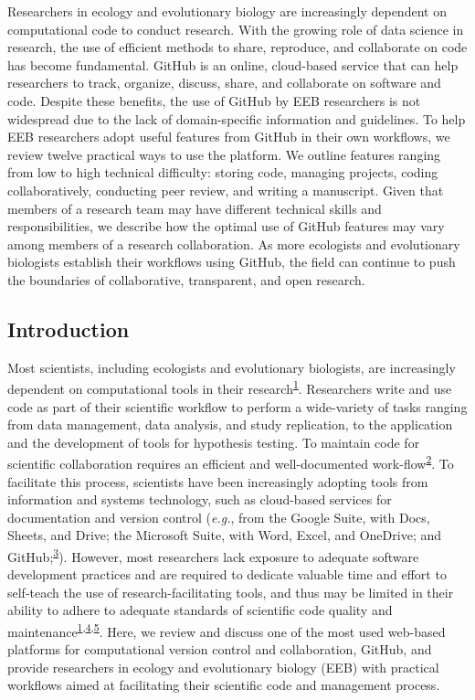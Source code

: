 Researchers in ecology and evolutionary biology are increasingly dependent on computational code to conduct research.
With the growing role of data science in research, the use of efficient methods to share, reproduce, and collaborate on code has become fundamental.
GitHub is an online, cloud-based service that can help researchers to track, organize, discuss, share, and collaborate on software and code.
Despite these benefits, the use of GitHub by EEB researchers is not widespread due to the lack of domain-specific information and guidelines.
To help EEB researchers adopt useful features from GitHub in their own workflows, we review twelve practical ways to use the platform.
We outline features ranging from low to high technical difficulty: storing code, managing projects, coding collaboratively, conducting peer review, and writing a manuscript.
Given that members of a research team may have different technical skills and responsibilities, we describe how the optimal use of GitHub features may vary among members of a research collaboration.
As more ecologists and evolutionary biologists establish their workflows using GitHub, the field can continue to push the boundaries of collaborative, transparent, and open research.

\hypertarget{introduction}{%
\subsection{Introduction}\label{introduction}}

Most scientists, including ecologists and evolutionary biologists, are increasingly dependent on computational tools in their research\textsuperscript{\protect\hyperlink{ref-fJWFe93e}{1}}.
Researchers write and use code as part of their scientific workflow to perform a wide-variety of tasks ranging from data management, data analysis, and study replication, to the application and the development of tools for hypothesis testing.
To maintain code for scientific collaboration requires an efficient and well-documented work-flow\textsuperscript{\protect\hyperlink{ref-1Kqna6l2}{2}}.
To facilitate this process, scientists have been increasingly adopting tools from information and systems technology, such as cloud-based services for documentation and version control (\emph{e.g.}, from the Google Suite, with Docs, Sheets, and Drive; the Microsoft Suite, with Word, Excel, and OneDrive; and GitHub;\textsuperscript{\protect\hyperlink{ref-10ghgV3S8}{3}}).
However, most researchers lack exposure to adequate software development practices and are required to dedicate valuable time and effort to self-teach the use of research-facilitating tools, and thus may be limited in their ability to adhere to adequate standards of scientific code quality and maintenance\textsuperscript{\protect\hyperlink{ref-fJWFe93e}{1},\protect\hyperlink{ref-10SpoByIw}{4},\protect\hyperlink{ref-O6UbstGG}{5}}.
Here, we review and discuss one of the most used web-based platforms for computational version control and collaboration, GitHub, and provide researchers in ecology and evolutionary biology (EEB) with practical workflows aimed at facilitating their scientific code and management process.

